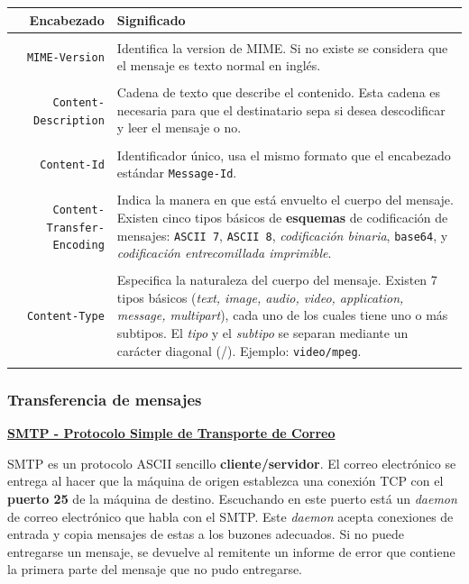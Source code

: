 \documentclass[10pt,a4paper]{article}
\begin{document}
\begin{tabular}{r p{10.5cm}}
{\bf Encabezado} & {\bf Significado} \\\hline \\ [-1.5ex]
\texttt{MIME-Version} &
Identifica la version de MIME. Si no existe se considera que el mensaje es texto normal en inglés.
\\ [1ex] \hline \\ [-1.5ex]
\texttt{Content-Description} &
Cadena de texto que describe el contenido. Esta cadena es necesaria para que el destinatario sepa si desea descodificar y leer el mensaje o no.
\\ [1ex] \hline \\ [-1.5ex]
\texttt{Content-Id} &
Identificador único, usa el mismo formato que el encabezado estándar \texttt{Message-Id}.
\\ [1ex] \hline \\ [-1.5ex]
\texttt{Content-Transfer-Encoding} &
Indica la manera en que está envuelto el cuerpo del mensaje. Existen cinco tipos básicos de \textbf{esquemas} de codificación de mensajes: \texttt{ASCII 7}, \texttt{ASCII 8}, \textit{codificación binaria}, \texttt{base64}, y \textit{codificación entrecomillada imprimible}.
\\ [1ex] \hline \\ [-1.5ex]
\texttt{Content-Type} &
Especifica la naturaleza del cuerpo del mensaje. Existen 7 tipos básicos (\textit{text, image, audio, video, application, message, multipart}), cada uno de los cuales tiene uno o más subtipos. El \textit{tipo} y el \textit{subtipo} se separan mediante un carácter diagonal (/). Ejemplo: \texttt{video/mpeg}.
\\ [1ex] \hline \\ [-1.5ex]
\end{tabular}

\subsubsection{Transferencia de mensajes}

\underline{\textbf{SMTP - Protocolo Simple de Transporte de Correo}}

SMTP es un protocolo ASCII sencillo \textbf{cliente/servidor}. El correo electrónico se entrega al hacer que la máquina de origen establezca una conexión TCP con el \textbf{puerto 25} de la máquina de destino. Escuchando en este puerto está un \textit{daemon} de correo electrónico que habla con el SMTP. Este \textit{daemon} acepta conexiones de entrada y copia mensajes de estas a los buzones adecuados. Si no puede entregarse un mensaje, se devuelve al remitente un informe de error que contiene la primera parte del mensaje que no pudo entregarse.
\end{document}
